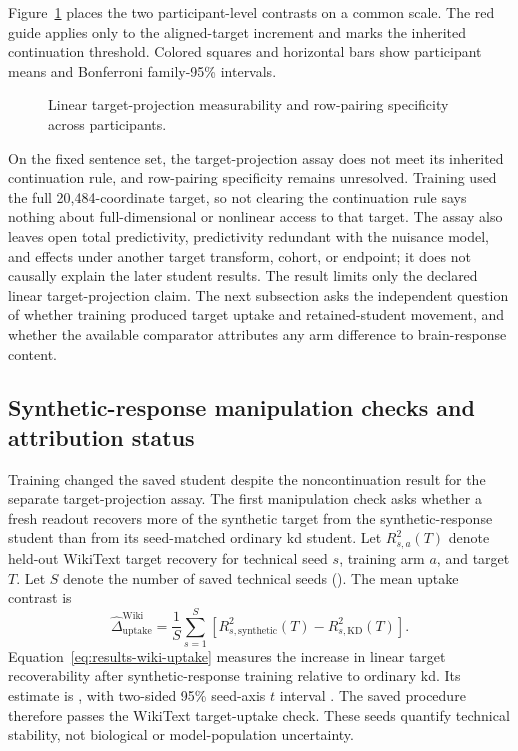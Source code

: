 Figure~\ref{fig:exact-target-measurability} places the two participant-level contrasts on a common scale.
The red guide applies only to the aligned-target increment and marks the inherited continuation threshold.
Colored squares and horizontal bars show participant means and Bonferroni family-95\% intervals.

\begin{figure}[H]
  \centering
  \resizebox{\linewidth}{!}{}
  \caption{Linear target-projection measurability and row-pairing specificity across participants.}
  \label{fig:exact-target-measurability}
\end{figure}
\FloatBarrier

 On the fixed sentence set, the target-projection assay does not meet its inherited continuation rule, and row-pairing specificity remains unresolved.
Training used the full 20,484-coordinate target, so not clearing the continuation rule says nothing about full-dimensional or nonlinear access to that target.
The assay also leaves open total predictivity, predictivity redundant with the nuisance model, and effects under another target transform, cohort, or endpoint; it does not causally explain the later student results.
The result limits only the declared linear target-projection claim.
The next subsection asks the independent question of whether training produced target uptake and retained-student movement, and whether the available comparator attributes any arm difference to brain-response content.

\subsection{Synthetic-response manipulation checks and attribution status}
\label{sec:results-synthetic-manipulation}

Training changed the saved student despite the noncontinuation result for the separate target-projection assay.
The first manipulation check asks whether a fresh readout recovers more of the synthetic target from the synthetic-response student than from its seed-matched ordinary \ac{kd} student.
Let \(R^2_{s,a}(T)\) denote held-out WikiText target recovery for technical seed \(s\), training arm \(a\), and target \(T\).
Let \(S\) denote the number of saved technical seeds ().
The mean uptake contrast is
\begin{equation}
\widehat{\Delta}_{\mathrm{uptake}}^{\mathrm{Wiki}}
=
\frac{1}{S}
\sum_{s=1}^{S}
\left[
R^2_{s,\mathrm{synthetic}}(T)
-
R^2_{s,\mathrm{KD}}(T)
\right].
\label{eq:results-wiki-uptake}
\end{equation}
Equation~\ref{eq:results-wiki-uptake} measures the increase in linear target recoverability after synthetic-response training relative to ordinary \ac{kd}.
Its estimate is , with two-sided 95\% seed-axis \(t\) interval .
The saved procedure therefore passes the WikiText target-uptake check.
These seeds quantify technical stability, not biological or model-population uncertainty. 

